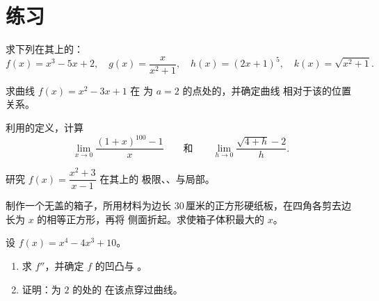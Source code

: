 \section{练习}

\begin{exercise}[$\star$]\label{exo:g12:deriv:1}
求下列在其上的：
\[
f(x) = x^3 - 5x + 2, \quad
g(x) = \frac{x}{x^2+1}, \quad
h(x) = (2x+1)^5, \quad
k(x) = \sqrt{x^2 + 1}.
\]
\end{exercise}

\begin{exercise}[$\star$]\label{exo:g12:deriv:2}
求曲线 $f(x) = x^2 - 3x + 1$ 在
为 $a = 2$ 的点处的，并确定曲线
相对于该的位置关系。
\end{exercise}

\begin{exercise}[$\star$]\label{exo:g12:deriv:3}
利用的定义，计算
\[
\lim_{x \to 0} \frac{(1+x)^{100} - 1}{x}
\qquad\text{和}\qquad
\lim_{h \to 0} \frac{\sqrt{4+h} - 2}{h}.
\]
\end{exercise}

\begin{exercise}[$\star\star$]\label{exo:g12:deriv:4}
研究 $f(x) = \dfrac{x^2 + 3}{x - 1}$ 在其上的
极限、、与局部。
\end{exercise}

\begin{exercise}[$\star\star$]\label{exo:g12:deriv:5}
制作一个无盖的箱子，所用材料为边长
$30\,$厘米的正方形硬纸板，在四角各剪去边长为 $x$ 的相等正方形，再将
侧面折起。求使箱子体积最大的 $x$。
\end{exercise}

\begin{exercise}[$\star\star$]\label{exo:g12:deriv:6}
设 $f(x) = x^4 - 4x^3 + 10$。
\begin{enumerate}
  \item 求 $f''$，并确定 $f$ 的凹凸与
        。
  \item 证明：为 $2$ 的处的
        在该点穿过曲线。
\end{enumerate}
\end{exercise}


